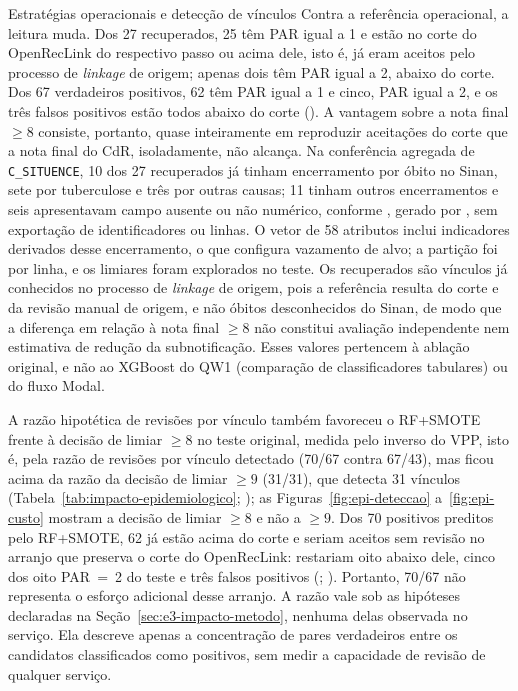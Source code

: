 \begin{chapter}{Estratégias operacionais e detecção de vínculos}
Contra a referência operacional, a leitura muda. Dos 27 recuperados, 25 têm PAR igual a 1 e estão no corte do OpenRecLink do respectivo passo ou acima dele, isto é, já eram aceitos pelo processo de \textit{linkage} de origem; apenas dois têm PAR igual a 2, abaixo do corte. Dos 67 verdadeiros positivos, 62 têm PAR igual a 1 e cinco, PAR igual a 2, e os três falsos positivos estão todos abaixo do corte (). A vantagem sobre a nota final $\geq 8$ consiste, portanto, quase inteiramente em reproduzir aceitações do corte que a nota final do CdR, isoladamente, não alcança. Na conferência agregada de \texttt{C\_SITUENCE}, 10 dos 27 recuperados já tinham encerramento por óbito no Sinan, sete por tuberculose e três por outras causas; 11 tinham outros encerramentos e seis apresentavam campo ausente ou não numérico, conforme , gerado por , sem exportação de identificadores ou linhas. O vetor de 58 atributos inclui indicadores derivados desse encerramento, o que configura vazamento de alvo; a partição foi por linha, e os limiares foram explorados no teste. Os recuperados são vínculos já conhecidos no processo de \textit{linkage} de origem, pois a referência resulta do corte e da revisão manual de origem, e não óbitos desconhecidos do Sinan, de modo que a diferença em relação à nota final $\geq 8$ não constitui avaliação independente nem estimativa de redução da subnotificação. Esses valores pertencem à ablação original, e não ao XGBoost do QW1 (comparação de classificadores tabulares) ou do fluxo Modal.

A razão hipotética de revisões por vínculo também favoreceu o RF+SMOTE frente à decisão de limiar $\geq 8$ no teste original, medida pelo inverso do VPP, isto é, pela razão de revisões por vínculo detectado (70/67 contra 67/43), mas ficou acima da razão da decisão de limiar $\geq 9$ (31/31), que detecta 31 vínculos (Tabela~\ref{tab:impacto-epidemiologico}; ); as Figuras~\ref{fig:epi-deteccao} a~\ref{fig:epi-custo} mostram a decisão de limiar $\geq 8$ e não a $\geq 9$. Dos 70 positivos preditos pelo RF+SMOTE, 62 já estão acima do corte e seriam aceitos sem revisão no arranjo que preserva o corte do OpenRecLink: restariam oito abaixo dele, cinco dos oito PAR~=~2 do teste e três falsos positivos (; ). Portanto, 70/67 não representa o esforço adicional desse arranjo. A razão vale sob as hipóteses declaradas na Seção~\ref{sec:e3-impacto-metodo}, nenhuma delas observada no serviço. Ela descreve apenas a concentração de pares verdadeiros entre os candidatos classificados como positivos, sem medir a capacidade de revisão de qualquer serviço.


\end{chapter}
